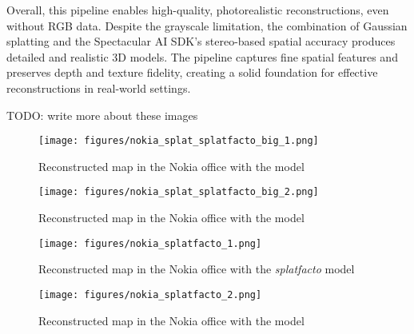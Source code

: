Overall, this pipeline enables high-quality, photorealistic reconstructions, even without RGB data. Despite the grayscale limitation, the combination of Gaussian splatting and the Spectacular AI SDK’s stereo-based spatial accuracy produces detailed and realistic 3D models. The pipeline captures fine spatial features and preserves depth and texture fidelity, creating a solid foundation for effective reconstructions in real-world settings.



TODO: write more about these images

\begin{figure}[htbp]
	\centering
	\texttt{[image: figures/nokia\_splat\_splatfacto\_big\_1.png]}
	\caption{Reconstructed map in the Nokia office with the  model}
	\label{fig:nokia_splatfacto_big_1}
\end{figure}


\begin{figure}[htbp]
	\centering
	\texttt{[image: figures/nokia\_splat\_splatfacto\_big\_2.png]}
	\caption{Reconstructed map in the Nokia office with the  model}
	\label{fig:nokia_splatfacto_big_2}
\end{figure}


\begin{figure}[htbp]
	\centering
	\texttt{[image: figures/nokia\_splatfacto\_1.png]}
	\caption{Reconstructed map in the Nokia office with the \textit{splatfacto} model}
	\label{fig:nokia_splatfacto_1}
\end{figure}

\begin{figure}[htbp]
	\centering
	\texttt{[image: figures/nokia\_splatfacto\_2.png]}
	\caption{Reconstructed map in the Nokia office with the  model}
	\label{fig:nokia_splatfacto_2}
\end{figure}

